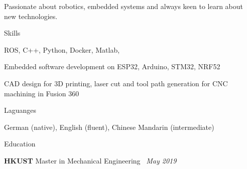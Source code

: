 \documentclass[
	a4paper, %
	11pt, %
]{resume} %
\begin{document}
Passionate about robotics, embedded systems and always keen to learn about new technologies.


\begin{rSection}{Skills}

	\item ROS, C++, Python, Docker, Matlab, 
	\item Embedded software development on ESP32, Arduino, STM32, NRF52
	\item CAD design for 3D printing, laser cut and tool path generation for CNC machining in Fusion 360

\end{rSection}


\begin{rSection}{Laguanges}
	
	\item German (native), English (fluent), Chinese Mandarin (intermediate)
	
\end{rSection}


\begin{rSection}{Education}
	
	\textbf{HKUST} Master in Mechanical Engineering \  \hfill \textit{May 2019}

	
\end{rSection}

\end{document}
